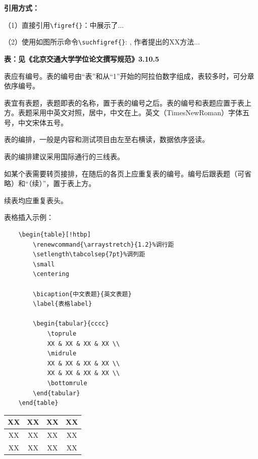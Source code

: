 \textbf{引用方式：}

（1）直接引用\verb|\figref{}|：中展示了...

（2）使用如图所示命令\verb|\suchfigref{}|: , 作者提出的XX方法...

\textbf{表：见《北京交通大学学位论文撰写规范》3.10.5}

表应有编号。表的编号由“表”和从“1”开始的阿拉伯数字组成，表较多时，可分章依序编号。

表宜有表题，表题即表的名称，置于表的编号之后。表的编号和表题应置于表上方。表题采用中英文对照，居中，中文在上。英文（TimesNewRoman）字体五号，中文宋体五号。

表的编排，一般是内容和测试项目由左至右横读，数据依序竖读。

表的编排建议采用国际通行的三线表。

如某个表需要转页接排，在随后的各页上应重复表的编号。编号后跟表题（可省略）和“（续）”，置于表上方。

续表均应重复表头。

表格插入示例：
\begin{verbatim}
	\begin{table}[!htbp]
		\renewcommand{\arraystretch}{1.2}%调行距
		\setlength\tabcolsep{7pt}%调列距
		\small
		\centering

		\bicaption{中文表题}{英文表题}
		\label{表格label}

		\begin{tabular}{cccc}
			\toprule
			XX & XX & XX & XX \\
			\midrule
			XX & XX & XX & XX \\
			XX & XX & XX & XX \\
			\bottomrule
		\end{tabular}
	\end{table}
\end{verbatim}

\begin{table}[!htbp]
	\renewcommand{\arraystretch}{1.2}%
	\setlength\tabcolsep{7pt}%
	\small
	\centering

	\label{tab:label}

	\begin{tabular}{cccc}
		\toprule
		XX & XX & XX & XX \\
		\midrule
		XX & XX & XX & XX \\
		XX & XX & XX & XX \\
		\bottomrule
	\end{tabular}
\end{table}

